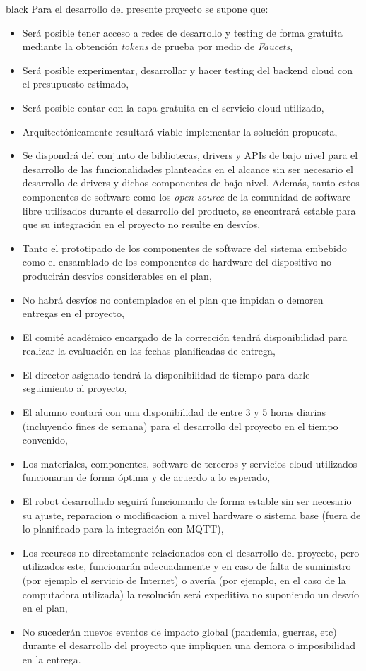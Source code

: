 \documentclass[
11pt, %
]{charter}
\begin{document}
\begin{consigna}{black}
Para el desarrollo del presente proyecto se supone que:

\begin{itemize}
	\item Será posible tener acceso a redes de desarrollo y testing de forma gratuita mediante la obtención \textit{tokens} de prueba por medio de \textit{Faucets},
	\item Será posible experimentar, desarrollar y hacer testing del backend cloud con el presupuesto estimado,
	\item Será posible contar con la capa gratuita en el servicio cloud utilizado,
	\item Arquitectónicamente resultará viable implementar la solución propuesta,
	\item Se dispondrá del conjunto de bibliotecas, drivers y APIs de bajo nivel para el desarrollo de las funcionalidades planteadas en el alcance sin ser necesario el desarrollo de drivers y dichos componentes de bajo nivel. Además, tanto estos componentes de software como los  \textit{open source} de la comunidad de software libre utilizados durante el desarrollo del producto, se encontrará estable para que su integración en el proyecto no resulte en desvíos,	
	\item Tanto el prototipado de los componentes de software del sistema embebido como el ensamblado de los componentes de hardware del dispositivo no producirán desvíos considerables en el plan,
	\item No habrá desvíos no contemplados en el plan que impidan o demoren entregas en el proyecto,
	\item El comité académico encargado de la corrección tendrá disponibilidad para realizar la evaluación en las fechas planificadas de entrega,
	\item El director asignado tendrá la disponibilidad de tiempo para darle seguimiento al proyecto,
	\item El alumno contará con una disponibilidad de entre 3 y 5 horas diarias (incluyendo fines de semana) para el desarrollo del proyecto en el tiempo convenido,
	\item Los materiales, componentes, software de terceros y servicios cloud utilizados funcionaran de forma óptima y de acuerdo a lo esperado,
	\item El robot desarrollado seguirá funcionando de forma estable sin ser necesario su ajuste, reparacion o modificacion a nivel hardware o sistema base (fuera de lo planificado para la integración con MQTT),
	\item Los recursos no directamente relacionados con el desarrollo del proyecto, pero utilizados este, funcionarán adecuadamente y en caso de falta de suministro (por ejemplo el servicio de Internet) o avería (por ejemplo, en el caso de la computadora utilizada) la resolución será expeditiva no suponiendo un desvío en el plan,
	\item No sucederán nuevos eventos de impacto global (pandemia, guerras, etc) durante el desarrollo del proyecto que impliquen una demora o imposibilidad en la entrega. 
\end{itemize}



\end{consigna}
\end{document}
